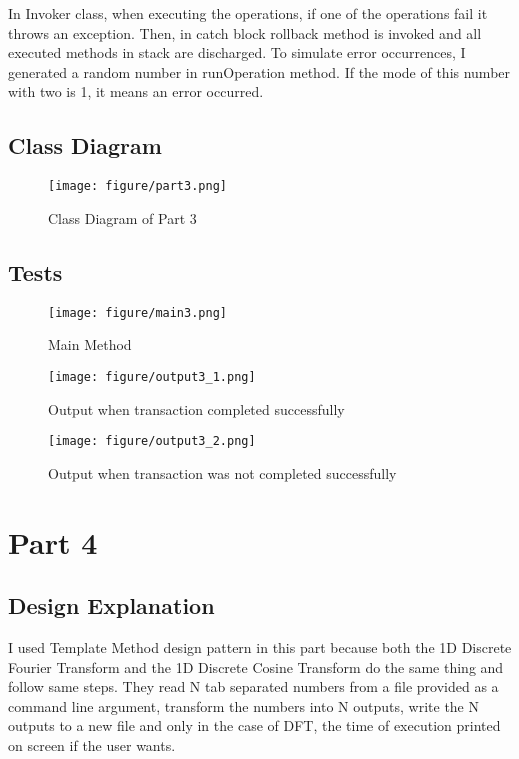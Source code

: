 \documentclass[twoside,11pt]{article}
\begin{document}
In Invoker class, when executing the operations, if one of the operations fail it throws an exception. Then, in catch block rollback method is invoked and all executed methods in stack are discharged. To simulate error occurrences, I generated a random number in runOperation method. If the mode of this number with two is 1, it means an error occurred.

\subsection{Class Diagram}

\begin{figure}[h]
\caption{Class Diagram of Part 3}
\centering
\texttt{[image: figure/part3.png]}
\end{figure}

\newpage

\subsection{Tests}

\begin{figure}[h]
\caption{Main Method}
\centering
\texttt{[image: figure/main3.png]}
\end{figure}

\begin{figure}[h]
\caption{Output when transaction completed successfully}
\centering
\texttt{[image: figure/output3\_1.png]}
\end{figure}

\newpage

\begin{figure}[h]
\caption{Output when transaction was not completed successfully}
\centering
\texttt{[image: figure/output3\_2.png]}
\end{figure}

\section{Part 4} 
\label{sec:background}

\subsection{Design Explanation}

I used Template Method design pattern in this part because both the 1D Discrete Fourier Transform and the 1D Discrete Cosine Transform do the same thing and follow same steps. They read N tab separated numbers from a file provided as a command line argument, transform the numbers into N outputs, write the N outputs to a new file and only in the case of DFT, the time of execution printed on screen if the user wants. \newline
\end{document}
